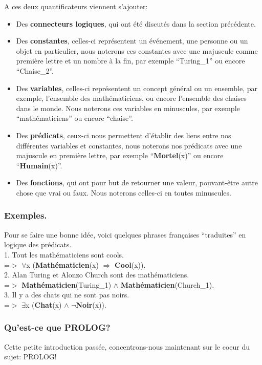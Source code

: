 \documentclass[a4paper, 12pt]{article}
\newcommand{\imply}{\Rightarrow}
\numberwithin{equation}{subsection}
\begin{document}
A ces deux quantificateurs viennent s'ajouter:
\begin{itemize}
  \item Des {\bf connecteurs logiques}, qui ont été discutés dans la section précédente.
  \item Des {\bf constantes}, celles-ci représentent un événement, une personne ou un objet en particulier, nous noterons ces constantes avec une majuscule comme première lettre et un nombre à la fin, par exemple ``Turing\_1'' ou encore ``Chaise\_2''.
  \item Des {\bf variables}, celles-ci représentent un concept général ou un ensemble, par exemple, l'ensemble des mathématiciens, ou encore l'ensemble des chaises dans le monde. Nous noterons ces variables en minuscules, par exemple ``mathématiciens'' ou encore ``chaise''.
  \item Des {\bf prédicats}, ceux-ci nous permettent d'établir des liens entre nos différentes variables et constantes, nous noterons nos prédicats avec une majuscule en première lettre, par exemple ``{\bf Mortel}(x)'' ou encore ``{\bf Humain}(x)''.
  \item Des {\bf fonctions}, qui ont pour but de retourner une valeur, pouvant-être autre chose que vrai ou faux. Nous noterons celles-ci en toutes minuscules.
\end{itemize}

\subsubsection{Exemples.}
Pour se faire une bonne idée, voici quelques phrases françaises ``traduites'' en logique des prédicats. \\[0.5cm]
1. Tout les mathématiciens sont cools. \\
=$>$ $\forall$x ({\bf Mathématicien}(x) $\imply$ {\bf Cool}(x)). \\[0.2cm]
2. Alan Turing et Alonzo Church sont des mathématiciens. \\
=$>$ {\bf Mathématicien}(Turing\_1) $\land$ {\bf Mathématicien}(Church\_1). \\[0.2cm]
3. Il y a des chats qui ne sont pas noirs. \\
=$>$ $\exists$x ({\bf Chat}(x) $\land$ $\neg${\bf Noir}(x)). \\[0.2cm]

\subsubsection{Qu'est-ce que PROLOG?}
Cette petite introduction passée, concentrons-nous maintenant sur le coeur du sujet: PROLOG! \\
\end{document}
